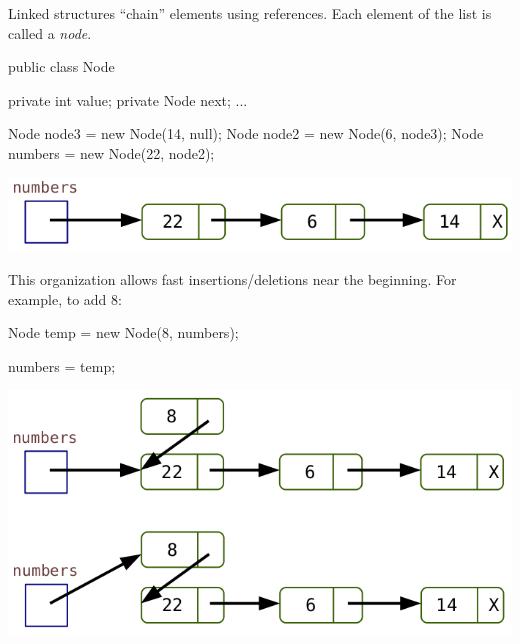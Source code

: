 
Linked structures ``chain'' elements using references.
Each element of the list is called a \emph{node}.

\vspace{1ex}
\begin{minipage}{0.40\linewidth}
\begin{javalst}
    public class Node {

        private int value;
        private Node next;
        ...
    }
\end{javalst}
\end{minipage}
\hfill
\begin{minipage}{0.58\linewidth}
\begin{javalst}
    Node node3 = new Node(14, null);
    Node node2 = new Node(6, node3);
    Node numbers = new Node(22, node2);
\end{javalst}
\includegraphics[scale=0.35]{figs/list1.png}
\end{minipage}
\vspace{1em}

This organization allows fast insertions/deletions near the beginning. For example, to add 8:

\vspace{1ex}
\begin{minipage}{0.48\linewidth}
\begin{javalst}
    Node temp = new Node(8, numbers);



    numbers = temp;
\end{javalst}
\end{minipage}
\hfill
\begin{minipage}{0.50\linewidth}
\includegraphics[scale=0.35]{figs/list2.png}
\end{minipage}
\vspace{1em}

